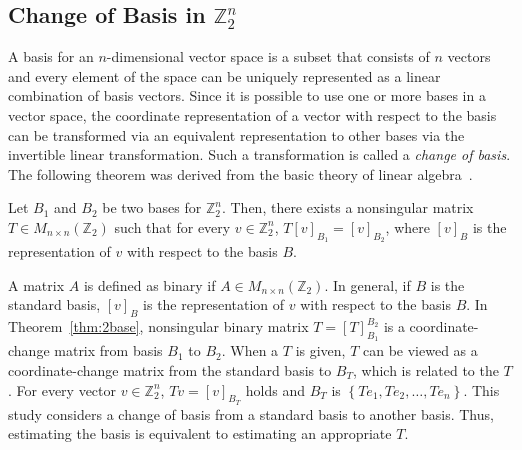 \subsection{Change of Basis in \boldmath$ \mathbb{Z}_2^n $}
A basis for an $ n $-dimensional vector space is a subset that consists of $ n $ vectors and every element of the space can be uniquely represented as a linear combination of basis vectors. Since it is possible to use one or more bases in a vector space, the coordinate representation of a vector with respect to the basis can be transformed via an equivalent representation to other bases via the invertible linear transformation. Such a transformation is called a \textit{change of basis}. The following theorem was derived from the basic theory of linear algebra~\cite{friedberglinear}.
\begin{theorem} \label{thm:2base}                                                                                                                                                                                                                                                                                                                                                                                                                                                                                                                                                               
	Let $ B_1 $ and $ B_2 $ be two bases for $ \mathbb{Z}_2^n $. Then, there exists a nonsingular matrix $ T\in M_{n\times n}\left(\mathbb{Z}_2\right) $ such that for every $ v\in\mathbb{Z}_2^n $, $ T\left[v\right]_{B_1}=\left[v\right]_{B_2} $, where $ \left[v\right]_B $ is the representation of $ v $ with respect to the basis $ B $.
\end{theorem}
A matrix $ A $ is defined as binary if $ A \in M_{n \times n }(\mathbb{Z}_2)$. In general, if $ B $ is the standard basis, $ \left[v\right]_B $ is the representation of $ v $ with respect to the basis $ B $. In Theorem~\ref{thm:2base}, nonsingular binary matrix $ T=\left[T\right]_{B_1}^{B_2} $ is a coordinate-change matrix from basis $ B_1 $ to $ B_2 $. When a $ T $ is given, $ T $ can be viewed as a coordinate-change matrix from the standard basis to $ B_T $, which is related to the $ T $. For every vector $ v\in\mathbb{Z}_2^n $, $ Tv=\left[v\right]_{B_T} $ holds and $ B_T $ is $ \left\{Te_1, Te_2, \ldots,Te_n\right\} $. This study considers a change of basis from a standard basis to another basis. Thus, estimating the basis is equivalent to estimating an appropriate $ T $.

